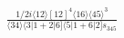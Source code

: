 \documentclass[varwidth, border=5pt]{standalone}
\begin{document}
\begin{my}
$\begin{gathered}
\scriptscriptstyle\frac{1/2i\langle12\rangle[12]^4\langle16\rangle\langle45\rangle^3}{\langle34\rangle\langle3|1+2|6]\langle5|1+6|2]s_{345}}
\end{gathered}$
\end{my}
\end{document}

